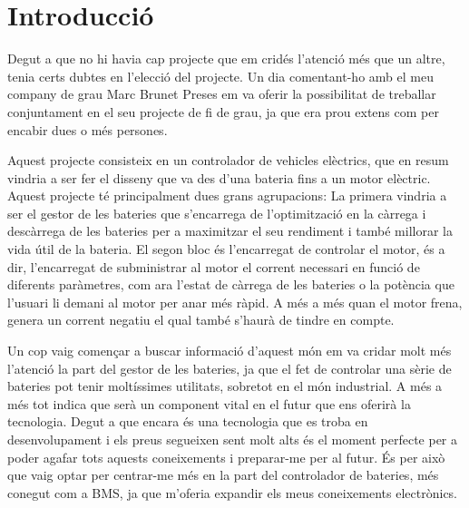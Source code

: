 \chapter{Introducció}
\label{chap:intro}

Degut a que no hi havia cap projecte que em cridés l'atenció més que un altre, tenia certs dubtes en l'elecció del projecte. Un dia comentant-ho amb el meu company de grau Marc Brunet Preses em va oferir la possibilitat de treballar conjuntament en el seu projecte de fi de grau, ja que era prou extens com per encabir dues o més persones.

Aquest projecte consisteix en un controlador de vehicles elèctrics, que en resum vindria a ser fer el disseny que va des d'una bateria fins a un motor elèctric. Aquest projecte té principalment dues grans agrupacions: La primera vindria a ser el gestor de les bateries que s'encarrega de \newline l'optimització en la càrrega i descàrrega de les bateries per a maximitzar el seu rendiment i també millorar la vida útil de la bateria. El segon bloc és l'encarregat de controlar el motor, és a dir, l'encarregat de subministrar al motor el corrent necessari en funció de diferents paràmetres, com ara l'estat de càrrega de les bateries o la potència que l'usuari li demani al motor per anar més ràpid. A més a més quan el motor frena, genera un corrent negatiu el qual també s'haurà de tindre en compte.

Un cop vaig començar a buscar informació d'aquest món em va cridar molt més l'atenció la part del gestor de les bateries, ja que el fet de controlar una sèrie de bateries pot tenir moltíssimes utilitats, sobretot en el món industrial. A més a més tot indica que serà un component vital en el futur que ens oferirà la tecnologia. Degut a que encara és una tecnologia que es troba en desenvolupament i els preus segueixen sent molt alts és el moment perfecte per a poder agafar tots aquests coneixements i preparar-me per al futur. És per això que vaig optar per centrar-me més en la part del controlador de bateries, més conegut com a BMS, ja que m'oferia expandir els meus coneixements electrònics.


